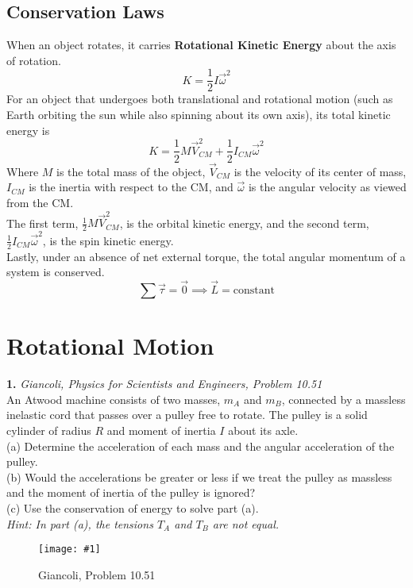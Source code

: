 \documentclass[11pt]{article}
\newcommand{\fig}[4]{
    \begin{figure}[H]
        \centering
        \texttt{[image: \#1]}
        \caption{#2}
        \label{exp4fit}
    \end{figure}
}
\theoremstyle{gangnamstyle}{\newtheorem{definition}{Definition}[]}
\theoremstyle{gangnamstyle}{\newtheorem{example}{Example}[]}
\theoremstyle{gangnamstyle}{\newtheorem{problem}{Problem}[]}
\begin{document}
\pagebreak

\subsection{Conservation Laws}

When an object rotates, it carries \textbf{Rotational Kinetic Energy} about the axis of rotation. 
\[ K = \frac{1}{2}I\Vec{\omega}^2 \]
For an object that undergoes both translational and rotational motion (such as Earth orbiting the sun while also spinning about its own axis), its total kinetic energy is
\[ K = \frac{1}{2}M\Vec{V}_{CM}^2 + \frac{1}{2}I_{CM}\Vec{\omega}^2 \]
Where $M$ is the total mass of the object, $\Vec{V}_{CM}$ is the velocity of its center of mass, $I_{CM}$ is the inertia with respect to the CM, and $\Vec{\omega}$ is the angular velocity as viewed from the CM. \\
The first term, $\frac{1}{2}M\Vec{V}_{CM}^2$, is the orbital kinetic energy, and the second term, $\frac{1}{2}I_{CM}\Vec{\omega}^2$, is the spin kinetic energy. \\

Lastly, under an absence of net external torque, the total angular momentum of a system is conserved. 
\[ \sum\Vec{\tau} = \Vec{0} \implies \Vec{L} = \text{constant} \]



\section{Rotational Motion}

\textbf{1.} \textit{Giancoli, Physics for Scientists and Engineers, Problem 10.51} \\
An Atwood machine consists of two masses, $m_A$ and $m_B$, connected by a massless inelastic cord that passes over a pulley free to rotate. The pulley is a solid cylinder of radius $R$ and moment of inertia $I$ about its axle. \\
(a) Determine the acceleration of each mass and the angular acceleration of the pulley. \\
(b) Would the accelerations be greater or less if we treat the pulley as massless and the moment of inertia of the pulley is ignored? \\
(c) Use the conservation of energy to solve part (a). \\
\textit{Hint: In part (a), the tensions $T_A$ and $T_B$ are not equal.}
\fig{figs/0718/g1051.png}{Giancoli, Problem 10.51}{0.6}{0}
\end{document}
